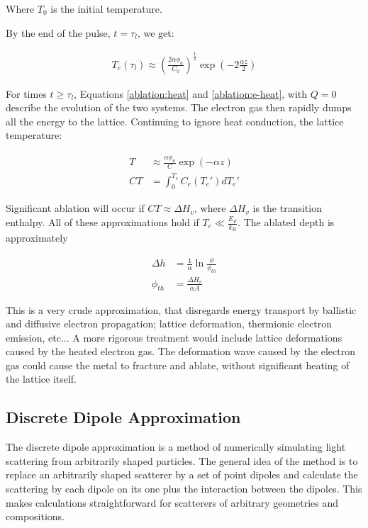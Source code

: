         Where $T_0$ is the initial temperature.

        By the end of the pulse, $t = \tau_l$, we get:

        \begin{align}
            T_e(\tau_l) \approx \left(\frac{2\alpha\phi_a}{C_0}\right)^{\frac{1}{2}}\exp\left(-2\frac{\alpha z}{2}\right)
        \end{align}

        For times $t \geq \tau_l$, Equations \ref{ablation:heat} and \ref{ablation:e-heat}, with $Q = 0$ describe the evolution of the
        two systems. The electron gas then rapidly dumps all the energy to the lattice. Continuing to ignore heat conduction, the lattice
        temperature:

        \begin{align}
            T &\approx \frac{\alpha \phi_a}{C}\exp(-\alpha z) \\
            CT &= \int_0^{T_e} C_e(T_e')dT_e'
        \end{align}

        Significant ablation will occur if $CT \approx \Delta H_v$, where $\Delta H_v$ is the transition enthalpy. All of these approximations
        hold if $T_e \ll \frac{E_F}{k_B}$. The ablated depth is approximately

        \begin{align}
            \Delta h &= \frac{1}{\alpha}\ln\frac{\phi}{\phi_{th}}\\
            \phi_{th} &= \frac{\Delta H_v}{\alpha A}
        \end{align}

        This is a very crude approximation, that disregards energy transport by ballistic and diffusive electron propagation; lattice deformation,
        thermionic electron emission, etc... A more rigorous treatment would include lattice deformations caused by the heated electron gas. The
        deformation wave caused by the electron gas could cause the metal to fracture and ablate, without significant heating of the lattice itself.

\subsection{Discrete Dipole Approximation}
\label{ap:DDA}

    The discrete dipole approximation is a method of numerically simulating light scattering from arbitrarily shaped particles.
    The general idea of the method is to replace an arbitrarily shaped scatterer by a set of point dipoles and calculate the
    scattering by each dipole on its one plus the interaction between the dipoles. This makes calculations straightforward
    for scatterers of arbitrary geometries and compositions.

